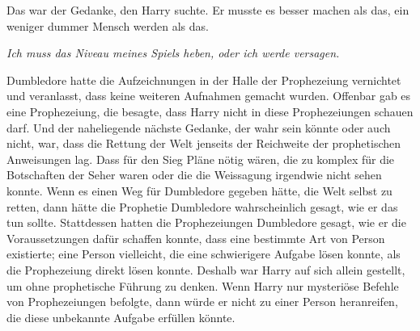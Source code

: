 Das war der Gedanke, den Harry suchte. Er musste es besser machen als das, ein weniger dummer Mensch werden als das.

\emph{Ich muss das Niveau meines Spiels heben, oder ich werde versagen.}

Dumbledore hatte die Aufzeichnungen in der Halle der Prophezeiung vernichtet und veranlasst, dass keine weiteren Aufnahmen gemacht wurden. Offenbar gab es eine Prophezeiung, die besagte, dass Harry nicht in diese Prophezeiungen schauen darf.
Und der naheliegende nächste Gedanke, der wahr sein könnte oder auch nicht, war, dass die Rettung der Welt jenseits der Reichweite der prophetischen Anweisungen lag. Dass für den Sieg Pläne nötig wären, die zu komplex für die Botschaften der Seher waren oder die die Weissagung irgendwie nicht sehen konnte. Wenn es einen Weg für Dumbledore gegeben hätte, die Welt selbst zu retten, dann hätte die Prophetie Dumbledore wahrscheinlich gesagt, wie er das tun sollte. Stattdessen hatten die Prophezeiungen Dumbledore gesagt, wie er die Voraussetzungen dafür schaffen konnte, dass eine bestimmte Art von Person existierte; eine Person vielleicht, die eine schwierigere Aufgabe lösen konnte, als die Prophezeiung direkt lösen konnte. Deshalb war Harry auf sich allein gestellt, um ohne prophetische Führung zu denken. Wenn Harry nur mysteriöse Befehle von Prophezeiungen befolgte, dann würde er nicht zu einer Person heranreifen, die diese unbekannte Aufgabe erfüllen könnte.

